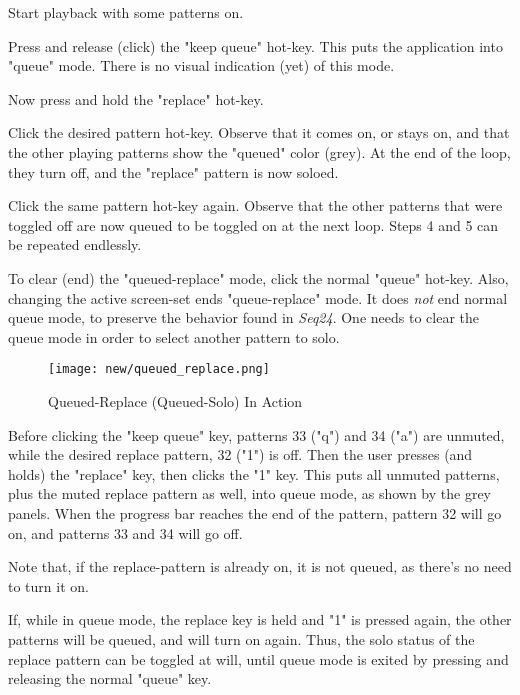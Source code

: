    \begin{enumber}
      \item Start playback with some patterns on. 
      \item Press and release (click)
         the "keep queue" hot-key.  This puts the application into "queue" mode.
         There is no visual indication (yet) of this mode.
      \item Now press and hold the "replace" hot-key.
      \item Click the desired pattern hot-key.  Observe that it comes on, or
         stays on, and that the other playing patterns show the "queued" color
         (grey).  At the end of the loop, they turn off, and the "replace"
         pattern is now soloed.
      \item Click the same pattern hot-key again.  Observe that the other
         patterns that were toggled off are now queued to be toggled on at the
         next loop.  Steps 4 and 5 can be repeated endlessly.
      \item To clear (end)
         the "queued-replace" mode, click the normal "queue"
         hot-key.  Also, changing the active screen-set ends "queue-replace"
         mode.  It does \textsl{not} end normal queue mode, to preserve the
         behavior found in \textsl{Seq24}.
         One needs to clear the queue mode in order to select another pattern
         to solo.
   \end{enumber}

\begin{figure}[H]
   \centering 
   \texttt{[image: new/queued\_replace.png]}
   \caption{Queued-Replace (Queued-Solo) In Action}
   \label{fig:queued_replace}
\end{figure}

   Before clicking the "keep queue" key, patterns 33 ("q") and 34 ("a") are
   unmuted, while the desired replace pattern, 32 ("1") is off.
   Then the user presses (and holds) the "replace" key, then clicks the "1"
   key.  This puts all unmuted patterns, plus the muted
   replace pattern as well, into queue mode, as shown by the grey panels.
   When the progress bar reaches the end of the pattern, pattern 32 will go on,
   and patterns 33 and 34 will go off.

   Note that, if the replace-pattern is already on, it is not queued, as
   there's no need to turn it on.

   If, while in queue mode, the replace key is held and "1" is pressed again,
   the other patterns will be queued, and will turn on again.  Thus, the
   solo status of the replace pattern can be toggled at will, until queue mode
   is exited by pressing and releasing the normal "queue" key.

